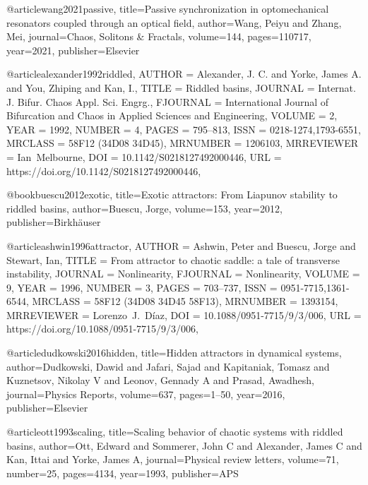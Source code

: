 @article{wang2021passive,
  title={Passive synchronization in optomechanical resonators coupled through an optical field},
  author={Wang, Peiyu and Zhang, Mei},
  journal={Chaos, Solitons \& Fractals},
  volume={144},
  pages={110717},
  year={2021},
  publisher={Elsevier}
}






@article{alexander1992riddled,
    AUTHOR = {Alexander, J. C. and Yorke, James A. and You, Zhiping and Kan,
              I.},
     TITLE = {Riddled basins},
   JOURNAL = {Internat. J. Bifur. Chaos Appl. Sci. Engrg.},
  FJOURNAL = {International Journal of Bifurcation and Chaos in Applied
              Sciences and Engineering},
    VOLUME = {2},
      YEAR = {1992},
    NUMBER = {4},
     PAGES = {795--813},
      ISSN = {0218-1274,1793-6551},
   MRCLASS = {58F12 (34D08 34D45)},
  MRNUMBER = {1206103},
MRREVIEWER = {Ian\ Melbourne},
       DOI = {10.1142/S0218127492000446},
       URL = {https://doi.org/10.1142/S0218127492000446},
}   





@book{buescu2012exotic,
  title={Exotic attractors: From Liapunov stability to riddled basins},
  author={Buescu, Jorge},
  volume={153},
  year={2012},
  publisher={Birkh{\"a}user}
}





@article{ashwin1996attractor,
    AUTHOR = {Ashwin, Peter and Buescu, Jorge and Stewart, Ian},
     TITLE = {From attractor to chaotic saddle: a tale of transverse
              instability},
   JOURNAL = {Nonlinearity},
  FJOURNAL = {Nonlinearity},
    VOLUME = {9},
      YEAR = {1996},
    NUMBER = {3},
     PAGES = {703--737},
      ISSN = {0951-7715,1361-6544},
   MRCLASS = {58F12 (34D08 34D45 58F13)},
  MRNUMBER = {1393154},
MRREVIEWER = {Lorenzo\ J.\ D\'iaz},
       DOI = {10.1088/0951-7715/9/3/006},
       URL = {https://doi.org/10.1088/0951-7715/9/3/006},
}





@article{dudkowski2016hidden,
  title={Hidden attractors in dynamical systems},
  author={Dudkowski, Dawid and Jafari, Sajad and Kapitaniak, Tomasz and Kuznetsov, Nikolay V and Leonov, Gennady A and Prasad, Awadhesh},
  journal={Physics Reports},
  volume={637},
  pages={1--50},
  year={2016},
  publisher={Elsevier}
}




@article{ott1993scaling,
  title={Scaling behavior of chaotic systems with riddled basins},
  author={Ott, Edward and Sommerer, John C and Alexander, James C and Kan, Ittai and Yorke, James A},
  journal={Physical review letters},
  volume={71},
  number={25},
  pages={4134},
  year={1993},
  publisher={APS}
}


